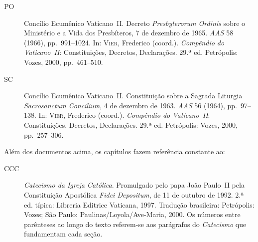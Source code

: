 \begin{description}
  \item[PO] Concílio Ecumênico Vaticano~II. Decreto \textit{Presbyterorum Ordinis} sobre o Ministério e a Vida dos Presbíteros, 7 de dezembro de 1965. \textit{AAS} 58 (1966), pp.~991--1024. In: \textsc{Vier}, Frederico (coord.). \textit{Compêndio do Vaticano~II}: Constituições, Decretos, Declarações. 29.ª ed. Petrópolis: Vozes, 2000, pp.~461--510.

  \item[SC] Concílio Ecumênico Vaticano~II. Constituição sobre a Sagrada Liturgia \textit{Sacrosanctum Concilium}, 4 de dezembro de 1963. \textit{AAS} 56 (1964), pp.~97--138. In: \textsc{Vier}, Frederico (coord.). \textit{Compêndio do Vaticano~II}: Constituições, Decretos, Declarações. 29.ª ed. Petrópolis: Vozes, 2000, pp.~257--306.

\end{description}

\bigskip
\noindent Além dos documentos acima, os capítulos fazem referência constante ao:

\bigskip
\begin{description}

  \item[CCC] \textit{Catecismo da Igreja Católica}. Promulgado pelo papa João Paulo~II pela Constituição Apostólica \textit{Fidei Depositum}, de 11 de outubro de 1992. 2.ª ed. típica: Libreria Editrice Vaticana, 1997. Tradução brasileira: Petrópolis: Vozes; São Paulo: Paulinas/Loyola/Ave-Maria, 2000. Os números entre parênteses ao longo do texto referem-se aos parágrafos do \textit{Catecismo} que fundamentam cada seção.

\end{description}
